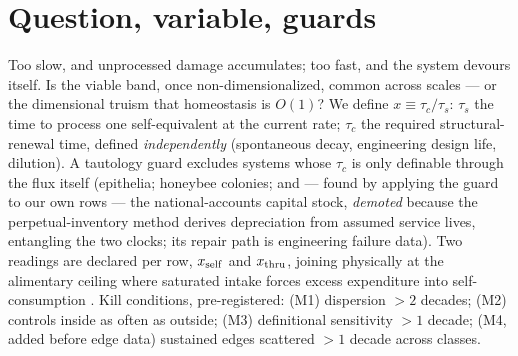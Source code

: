 \documentclass[11pt]{article}
\begin{document}
\section{Question, variable, guards}
Too slow, and unprocessed damage accumulates; too fast, and the system devours itself. Is the
viable band, once non-dimensionalized, common across scales --- or the dimensional truism that
homeostasis is $O(1)$? We define $x \equiv \tau_c/\tau_s$: $\tau_s$ the time to process one
self-equivalent at the current rate; $\tau_c$ the required structural-renewal time, defined
\emph{independently} (spontaneous decay, engineering design life, dilution). A tautology guard
excludes systems whose $\tau_c$ is only definable through the flux itself (epithelia; honeybee
colonies; and --- found by applying the guard to our own rows --- the national-accounts capital
stock, \emph{demoted} because the perpetual-inventory method derives depreciation from assumed
service lives, entangling the two clocks; its repair path is engineering failure data). Two
readings are declared per row, $x_{\rm self}$ and $x_{\rm thru}$, joining physically at the
alimentary ceiling where saturated intake forces excess expenditure into self-consumption
\cite{Thurber2019}. Kill conditions, pre-registered: (M1) dispersion $>2$ decades; (M2) controls
inside as often as outside; (M3) definitional sensitivity $>1$ decade; (M4, added before edge
data) sustained edges scattered $>1$ decade across classes.
\end{document}

